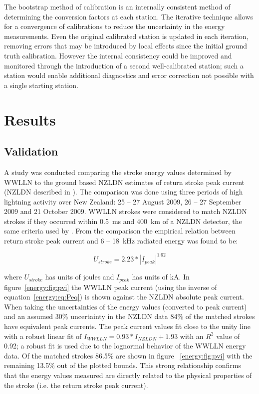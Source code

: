The bootstrap method of calibration is an internally consistent method of determining the conversion factors at each station.
The iterative technique allows for a convergence of calibrations to reduce the uncertainty in the energy measurements.
Even the original calibrated station is updated in each iteration, removing errors that may be introduced by local effects since the initial ground truth calibration.
However the internal consistency could be improved and monitored through the introduction of a second well-calibrated station; such a station would enable additional diagnostics and error correction not possible with a single starting station.

\section{Results}

\subsection{Validation}

A study was conducted comparing the stroke energy values determined by WWLLN to the ground based NZLDN estimates of return stroke peak current (NZLDN described in \citet{Rodger2006}).
The comparison was done using three periods of high lightning activity over New Zealand: 25 -- 27 August 2009, 26 -- 27 September 2009 and 21 October 2009.
WWLLN strokes were considered to match NZLDN strokes if they occurred within 0.5~ms and 400~km of a NZLDN detector, the same criteria used by \citet{Rodger2006}.
From the comparison the empirical relation between return stroke peak current and 6 -- 18~kHz radiated energy was found to be: 

\begin{equation}
U_{stroke} = 2.23 * |I_{peak}|^{1.62}
\label{energy:eq:Peq}
\end{equation}

where $U_{stroke}$ has units of joules and $I_{peak}$ has units of kA.
In figure~\ref{energy:fig:pvi} the WWLLN peak current (using the inverse of equation~\ref{energy:eq:Peq}) is shown against the NZLDN absolute peak current.
When taking the uncertainties of the energy values (converted to peak current) and an assumed 30\% uncertainty in the NZLDN data 84\% of the matched strokes have equivalent peak currents.
The peak current values fit close to the unity line with a robust linear fit of $I_{WWLLN}=0.93*I_{NZLDN}+1.93$ with an $R^2$ value of 0.92; a robust fit is used due to the lognormal behavior of the WWLLN energy data.
Of the matched strokes 86.5\% are shown in figure~ \ref{energy:fig:pvi} with the remaining 13.5\% out of the plotted bounds.
This strong relationship confirms that the energy values measured are directly related to the physical properties of the stroke (i.e. the return stroke peak current).

